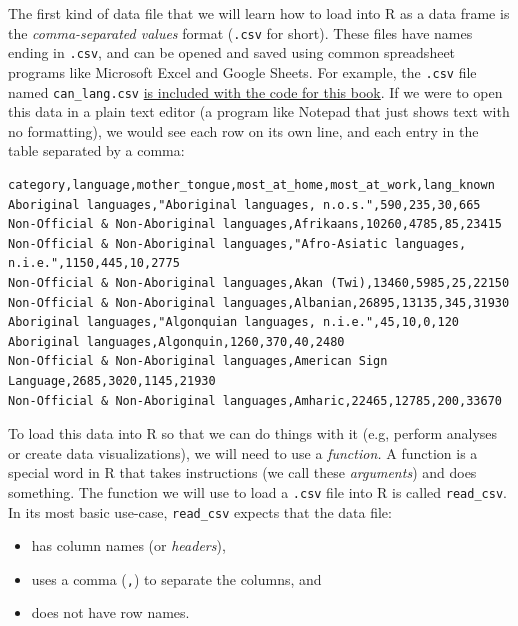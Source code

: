 \documentclass[
]{book}
\providecommand{\tightlist}{%
  \setlength{\itemsep}{0pt}\setlength{\parskip}{0pt}}
\begin{document}
The first kind of data file that we will learn how to load into R as a data
frame is the \emph{comma-separated values} format (\texttt{.csv} for short). These files
have names ending in \texttt{.csv}, and can be opened and saved using common
spreadsheet programs like Microsoft Excel and Google Sheets. For example, the
\texttt{.csv} file named \texttt{can\_lang.csv}
\href{https://raw.githubusercontent.com/UBC-DSCI/introduction-to-datascience/master/data/can_lang.csv}{is included with the code for this book}.
If we were to open this data in a plain text editor (a program like Notepad that just shows
text with no formatting), we would see each row on its own line, and each entry in the table separated by a comma:

\begin{verbatim}
category,language,mother_tongue,most_at_home,most_at_work,lang_known
Aboriginal languages,"Aboriginal languages, n.o.s.",590,235,30,665
Non-Official & Non-Aboriginal languages,Afrikaans,10260,4785,85,23415
Non-Official & Non-Aboriginal languages,"Afro-Asiatic languages, n.i.e.",1150,445,10,2775
Non-Official & Non-Aboriginal languages,Akan (Twi),13460,5985,25,22150
Non-Official & Non-Aboriginal languages,Albanian,26895,13135,345,31930
Aboriginal languages,"Algonquian languages, n.i.e.",45,10,0,120
Aboriginal languages,Algonquin,1260,370,40,2480
Non-Official & Non-Aboriginal languages,American Sign Language,2685,3020,1145,21930
Non-Official & Non-Aboriginal languages,Amharic,22465,12785,200,33670
\end{verbatim}

To load this data into R so that we can do things with it (e.g, perform
analyses or create data visualizations), we will need to use a \emph{function.}  A
function is a special word in R that takes instructions (we call these
\emph{arguments})  and does something. The function we will use to load a \texttt{.csv} file
into R is called \texttt{read\_csv}.  In its most basic
use-case, \texttt{read\_csv} expects that the data file:

\begin{itemize}
\tightlist
\item
  has column names (or \emph{headers}),
\item
  uses a comma (\texttt{,}) to separate the columns, and
\item
  does not have row names.
\end{itemize}
\end{document}
